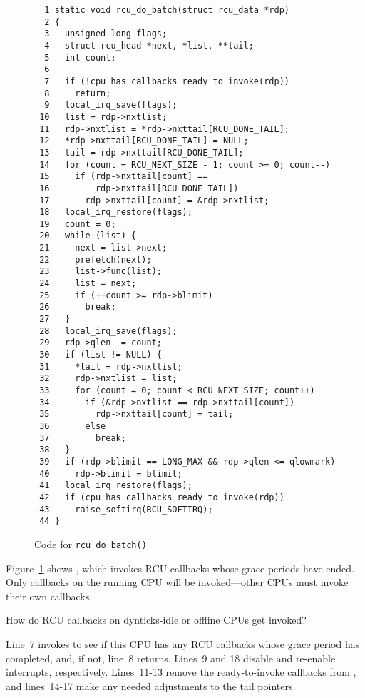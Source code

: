 \begin{figure}[tbp]
{ \scriptsize
\begin{verbatim}
  1 static void rcu_do_batch(struct rcu_data *rdp)
  2 {
  3   unsigned long flags;
  4   struct rcu_head *next, *list, **tail;
  5   int count;
  6
  7   if (!cpu_has_callbacks_ready_to_invoke(rdp))
  8     return;
  9   local_irq_save(flags);
 10   list = rdp->nxtlist;
 11   rdp->nxtlist = *rdp->nxttail[RCU_DONE_TAIL];
 12   *rdp->nxttail[RCU_DONE_TAIL] = NULL;
 13   tail = rdp->nxttail[RCU_DONE_TAIL];
 14   for (count = RCU_NEXT_SIZE - 1; count >= 0; count--)
 15     if (rdp->nxttail[count] ==
 16         rdp->nxttail[RCU_DONE_TAIL])
 17       rdp->nxttail[count] = &rdp->nxtlist;
 18   local_irq_restore(flags);
 19   count = 0;
 20   while (list) {
 21     next = list->next;
 22     prefetch(next);
 23     list->func(list);
 24     list = next;
 25     if (++count >= rdp->blimit)
 26       break;
 27   }
 28   local_irq_save(flags);
 29   rdp->qlen -= count;
 30   if (list != NULL) {
 31     *tail = rdp->nxtlist;
 32     rdp->nxtlist = list;
 33     for (count = 0; count < RCU_NEXT_SIZE; count++)
 34       if (&rdp->nxtlist == rdp->nxttail[count])
 35         rdp->nxttail[count] = tail;
 36       else
 37         break;
 38   }
 39   if (rdp->blimit == LONG_MAX && rdp->qlen <= qlowmark)
 40     rdp->blimit = blimit;
 41   local_irq_restore(flags);
 42   if (cpu_has_callbacks_ready_to_invoke(rdp))
 43     raise_softirq(RCU_SOFTIRQ);
 44 }
\end{verbatim}
}
\caption{Code for {\tt rcu\_do\_batch()}}
\label{fig:app:rcuimpl:rcutreewt:Code for rcu-do-batch}
\end{figure}

Figure~\ref{fig:app:rcuimpl:rcutreewt:Code for rcu-do-batch}
shows , which invokes RCU callbacks
whose grace periods have ended.
Only callbacks on the running CPU will be invoked---other CPUs must
invoke their own callbacks.

\QuickQuiz{}
	How do RCU callbacks on dynticks-idle or offline CPUs
	get invoked?
 \QuickQuizEnd

Line~7 invokes  to see if
this CPU has any RCU callbacks whose grace period has completed,
and, if not, line~8 returns.
Lines~9 and 18 disable and re-enable interrupts, respectively.
Lines~11-13 remove the ready-to-invoke callbacks from ,
and lines~14-17 make any needed adjustments to the tail pointers.

